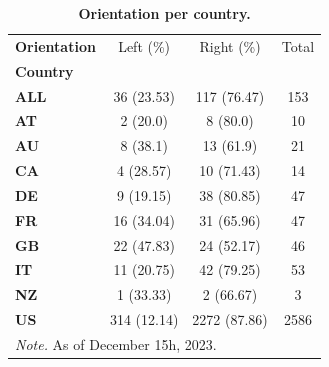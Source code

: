 \begin{table}[H]
\centering
\caption{\textbf{Orientation per country.}}
\label{table:table4}
\begin{tabularx}{\textwidth}{ X c c c}
\toprule
\textbf{Orientation} &     Left (\%) &     Right (\%) &  Total \\
\textbf{Country} &              &               &        \\
\midrule
\textbf{ALL    } &   36 (23.53) &   117 (76.47) &    153 \\
\textbf{AT     } &     2 (20.0) &      8 (80.0) &     10 \\
\textbf{AU     } &     8 (38.1) &     13 (61.9) &     21 \\
\textbf{CA     } &    4 (28.57) &    10 (71.43) &     14 \\
\textbf{DE     } &    9 (19.15) &    38 (80.85) &     47 \\
\textbf{FR     } &   16 (34.04) &    31 (65.96) &     47 \\
\textbf{GB     } &   22 (47.83) &    24 (52.17) &     46 \\
\textbf{IT     } &   11 (20.75) &    42 (79.25) &     53 \\
\textbf{NZ     } &    1 (33.33) &     2 (66.67) &      3 \\
\textbf{US     } &  314 (12.14) &  2272 (87.86) &   2586 \\
\bottomrule
\multicolumn{4}{l}{\textit{Note.} As of December 15h, 2023.}
\end{tabularx}
\end{table}
